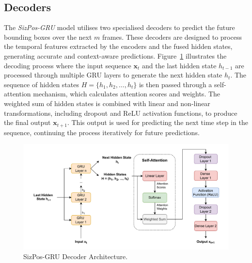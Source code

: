 \documentclass[12pt,oneside]{book} %
\begin{document}
\subsection{Decoders}
\noindent The \textit{SizPos-GRU} model utilises two specialised decoders to predict the future bounding boxes over the next \(m\) frames. These decoders are designed to process the temporal features extracted by the encoders and the fused hidden states, generating accurate and context-aware predictions. Figure~\ref{fig:sizpos-gru-decoder} illustrates the decoding process where the input sequence \( \mathbf{x}_t \) and the last hidden state \( h_{t-1} \) are processed through multiple GRU layers to generate the next hidden state \( h_t \). The sequence of hidden states \( H = \{h_1, h_2, \dots, h_t\} \) is then passed through a self-attention mechanism, which calculates attention scores and weights. The weighted sum of hidden states is combined with linear and non-linear transformations, including dropout and ReLU activation functions, to produce the final output \( \mathbf{x}_{t+1} \). This output is used for predicting the next time step in the sequence, continuing the process iteratively for future predictions.

\begin{figure}[H]
    \centering
    \includegraphics[width=1\textwidth]{figures/GRUSizPosDecoder.drawio.pdf}
    \caption{SizPos-GRU Decoder Architecture.}
    \label{fig:sizpos-gru-decoder}
\end{figure}
\end{document}
